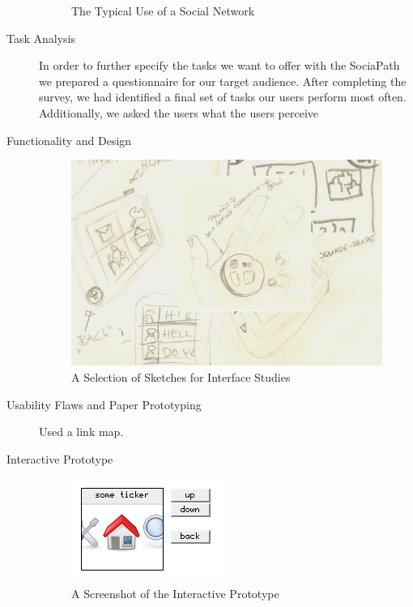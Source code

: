 \begin{description}
\begin{figure}[h]
\begin{center}
  \end{center}
  \caption{The Typical Use of a Social Network}
  \label{fig:context}
\end{figure}
  \item[Task Analysis]
    In order to further specify the tasks we want to offer with the SociaPath
    we prepared a questionnaire for our target audience. After completing the 
    survey, we had identified a final set of tasks our users perform most often. 
    Additionally, we asked the users what the users perceive
  \item[Functionality and Design]
\begin{figure}[h]
  \begin{center}
    \includegraphics[width=0.8\linewidth]{imgs/sketches.png}
  \end{center}
  \caption{A Selection of Sketches for Interface Studies}
  \label{fig:sketches}
\end{figure}
  \item[Usability Flaws and Paper Prototyping]
    Used a link map.
  \item[Interactive Prototype]
\begin{figure}[h]
  \begin{center}
    \includegraphics[width=0.8\linewidth]{imgs/screen.png}
  \end{center}
  \caption{A Screenshot of the Interactive Prototype}
  \label{fig:prototype}
\end{figure}
\end{description}
